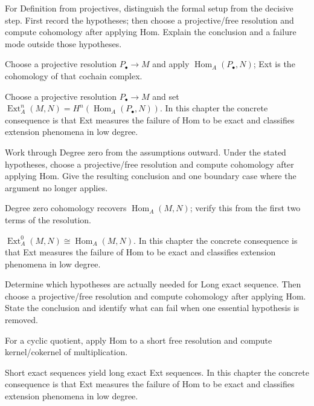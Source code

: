\begin{exercise}\label{exr:v27-01}
For Definition from projectives, distinguish the formal setup from the decisive step. First record the hypotheses; then choose a projective/free resolution and compute cohomology after applying Hom. Explain the conclusion and a failure mode outside those hypotheses.
\end{exercise}
\begin{hint}
Choose a projective resolution \(P_\bullet\to M\) and apply \(\operatorname{Hom}_A(P_\bullet,N)\); Ext is the cohomology of that cochain complex.
\end{hint}
\begin{solution}
Choose a projective resolution $P_\bullet\to M$ and set $\operatorname{Ext}_A^n(M,N)=H^n(\operatorname{Hom}_A(P_\bullet,N))$. In this chapter the concrete consequence is that Ext measures the failure of Hom to be exact and classifies extension phenomena in low degree.
\end{solution}

\begin{exercise}\label{exr:v27-02}
Work through Degree zero from the assumptions outward. Under the stated hypotheses, choose a projective/free resolution and compute cohomology after applying Hom. Give the resulting conclusion and one boundary case where the argument no longer applies.
\end{exercise}
\begin{hint}
Degree zero cohomology recovers \(\operatorname{Hom}_A(M,N)\); verify this from the first two terms of the resolution.
\end{hint}
\begin{solution}
$\operatorname{Ext}_A^0(M,N)\cong\operatorname{Hom}_A(M,N)$. In this chapter the concrete consequence is that Ext measures the failure of Hom to be exact and classifies extension phenomena in low degree.
\end{solution}

\begin{exercise}\label{exr:v27-03}
Determine which hypotheses are actually needed for Long exact sequence. Then choose a projective/free resolution and compute cohomology after applying Hom. State the conclusion and identify what can fail when one essential hypothesis is removed.
\end{exercise}
\begin{hint}
For a cyclic quotient, apply Hom to a short free resolution and compute kernel/cokernel of multiplication.
\end{hint}
\begin{solution}
Short exact sequences yield long exact Ext sequences. In this chapter the concrete consequence is that Ext measures the failure of Hom to be exact and classifies extension phenomena in low degree.
\end{solution}

